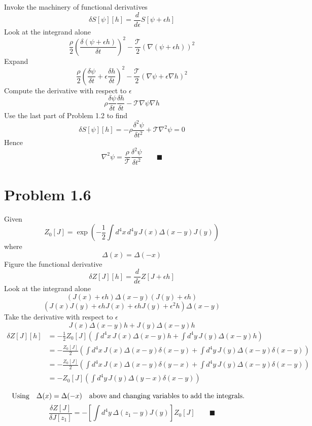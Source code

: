\documentclass{amsart}
\begin{document}
Invoke the machinery of functional derivatives
\[\delta S[\psi][h]=\frac{d}{d\epsilon}S[\psi+\epsilon h]\]
Look at the integrand alone
\[\frac{\rho}{2}\left(\frac{\delta (\psi+\epsilon h)}{\delta t}\right)^2 - \frac{\mathcal{T}}{2}\left(\nabla(\psi+\epsilon h)\right)^2\]
Expand
\[\frac{\rho}{2}\left(\frac{\delta \psi}{\delta t}+\epsilon \frac{\delta h}{\delta t}\right)^2 - \frac{\mathcal{T}}{2}\left(\nabla \psi+\epsilon \nabla h\right)^2\]
Compute the derivative with respect to $\epsilon$
\[\rho\frac{\delta \psi}{\delta t}\frac{\delta h}{\delta t} - \mathcal{T}\nabla \psi \nabla h\]
Use the last part of Problem 1.2 to find
\[\delta S[\psi][h]=-\rho\frac{\delta^2 \psi}{\delta t^2} + \mathcal{T}\nabla^2 \psi =0\]
Hence
\[\nabla^2 \psi=\frac{\rho}{\mathcal{T}}\frac{\delta^2 \psi}{\delta t^2} \qquad \blacksquare\]

\section*{Problem 1.6}
Given \[Z_0[J]=\exp\left(-\frac{1}{2}\int d^4 x\, d^4 y\, J(x) \Delta(x-y) J(y)\right)\]
where \[\Delta(x)=\Delta(-x)\]
Figure the functional derivative
\[\delta Z[J][h]=\frac{d}{d\epsilon}Z[J+\epsilon h]\]
Look at the integrand alone
\[(J(x)+\epsilon h) \Delta(x-y) (J(y)+\epsilon h)\]
\[(J(x)J(y)+\epsilon h J(x)+\epsilon h J(y)+\epsilon^2 h) \Delta(x-y)\]
Take the derivative with respect to $\epsilon$
\[J(x) \Delta(x-y)h + J(y) \Delta(x-y)h\]
\begin{align*}
\delta Z[J][h]&=-\frac{1}{2}Z_0[J]\left(\int d^4 x\,  J(x) \Delta(x-y)h +\int d^4 y\,J(y) \Delta(x-y)h\right)\\
&=-\frac{Z_0[J]}{2}\left(\int d^4 x\,  J(x) \Delta(x-y)\delta(x-y) +\int d^4 y\,J(y) \Delta(x-y)\delta(x-y)\right)\\
&=-\frac{Z_0[J]}{2}\left(\int d^4 x\,  J(x) \Delta(x-y)\delta(y-x) +\int d^4 y\,J(y) \Delta(x-y)\delta(x-y)\right)\\ 
&=-Z_0[J]\left(\int d^4 y\,J(y) \Delta(y-x)\delta(x-y)\right)\\
\end{align*}
\[\qq*{Using}\Delta(x)=\Delta(-x)\qq{above and changing variables to add the integrals.}\]
\[\frac{\delta Z[J]}{\delta J[z_1]}=-\left[\int d^4 y\, \Delta(z_1-y)J(y)\right]Z_0[J] \qquad \blacksquare\]
\end{document}
